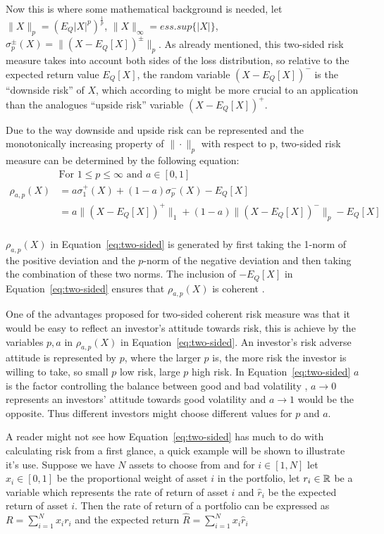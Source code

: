 \documentclass{pdfmx4020}
\begin{document}
  Now this is where some mathematical background is needed, let $\| X \|_p = (E_Q |X|^p)^{\frac{1}{p}}$, $\|X\|_\infty = ess.sup \{ |X|\}$, $\sigma_p^{\pm} (X) = \|(X-E_Q[X])^{\pm}\|_p$. As already mentioned, this two-sided risk measure takes into account both sides of the loss distribution, so relative to the expected return value $E_Q[X]$, the random variable $(X-E_Q[X])^-$ is the ``downside risk'' of $X$, which according to \cite{two_sided_risk} might be more crucial to an application than the analogues ``upside risk'' variable $(X-E_Q[X])^+$.

  Due to the way downside and upside risk can be represented and the monotonically increasing property of $\| \cdot \|_p$ with respect to p, two-sided risk measure can be determined by the following equation:
  \begin{equation} \label{eq:two-sided}
    \begin{split}
      & \text{For } 1 \leq p \leq \infty \text{ and } a \in [0,1] \\
      \rho_{a,p}(X) & = a \sigma_1^+(X) + (1-a)\sigma_p^-(X) - E_Q[X ]\\
      & = a \|(X-E_Q[X])^+\|_1 + (1-a) \|(X-E_Q[X])^-\|_p - E_Q[X] \\
    \end{split}
  \end{equation}

  $\rho_{a,p}(X)$ in Equation~\ref{eq:two-sided} is generated by first taking the 1-norm of the positive deviation and the $p$-norm of the negative deviation and then taking the combination of these two norms. The inclusion of $- E_Q[X]$ in Equation~\ref{eq:two-sided} ensures that $\rho_{a,p}(X)$ is coherent \cite{two_sided_risk}. 

  One of the advantages proposed for two-sided coherent risk measure was that it would be easy to reflect an investor's attitude towards risk, this is achieve by the variables $p,a$ in $\rho_{a,p}(X)$ in Equation~\ref{eq:two-sided}. An investor's risk adverse attitude is represented by $p$, where the larger $p$ is, the more risk the investor is willing to take, so small $p$ low risk, large $p$ high risk. In Equation~\ref{eq:two-sided} $a$ is the factor controlling the balance between good and bad volatility \cite{two_sided_risk}, $a \to 0$ represents an investors' attitude towards good volatility and $a \to 1$ would be the opposite. Thus different investors might choose different values for $p$ and $a$.

  A reader might not see how Equation~\ref{eq:two-sided} has much to do with calculating risk from a first glance, a quick example will be shown to illustrate it's use. Suppose we have $N$ assets to choose from and for $i \in [1,N]$ let $x_i \in [0,1]$ be the proportional weight of asset $i$ in the portfolio, let $r_i \in \mathbb{R}$ be a variable which represents the rate of return of asset $i$ and $\widehat{r}_i$ be the expected return of asset $i$. Then the rate of return of a portfolio can be expressed as $R = \sum_{i=1}^N x_i r_i$ and the expected return $\widehat{R} = \sum_{i=1}^N  x_i \widehat{r}_i$
\end{document}
